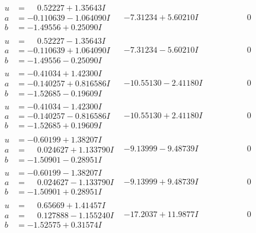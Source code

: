 \documentclass[1p]{elsarticle_modified}
\theoremstyle{definition}
\begin{document}
$$\begin{array}{c|c|c}
\begin{aligned}
u &= \phantom{-}0.52227 + 1.35643 I \\
a &= -0.110639 - 1.064090 I \\
b &= -1.49556 + 0.25090 I\end{aligned}
 & -7.31234 + 5.60210 I & \phantom{-0.000000 } 0 \\ \hline\begin{aligned}
u &= \phantom{-}0.52227 - 1.35643 I \\
a &= -0.110639 + 1.064090 I \\
b &= -1.49556 - 0.25090 I\end{aligned}
 & -7.31234 - 5.60210 I & \phantom{-0.000000 } 0 \\ \hline\begin{aligned}
u &= -0.41034 + 1.42300 I \\
a &= -0.140257 + 0.816586 I \\
b &= -1.52685 - 0.19609 I\end{aligned}
 & -10.55130 - 2.41180 I & \phantom{-0.000000 } 0 \\ \hline\begin{aligned}
u &= -0.41034 - 1.42300 I \\
a &= -0.140257 - 0.816586 I \\
b &= -1.52685 + 0.19609 I\end{aligned}
 & -10.55130 + 2.41180 I & \phantom{-0.000000 } 0 \\ \hline\begin{aligned}
u &= -0.60199 + 1.38207 I \\
a &= \phantom{-}0.024627 + 1.133790 I \\
b &= -1.50901 - 0.28951 I\end{aligned}
 & -9.13999 - 9.48739 I & \phantom{-0.000000 } 0 \\ \hline\begin{aligned}
u &= -0.60199 - 1.38207 I \\
a &= \phantom{-}0.024627 - 1.133790 I \\
b &= -1.50901 + 0.28951 I\end{aligned}
 & -9.13999 + 9.48739 I & \phantom{-0.000000 } 0 \\ \hline\begin{aligned}
u &= \phantom{-}0.65669 + 1.41457 I \\
a &= \phantom{-}0.127888 - 1.155240 I \\
b &= -1.52575 + 0.31574 I\end{aligned}
 & -17.2037 + 11.9877 I & \phantom{-0.000000 } 0 \\ \hline\begin{aligned}

\end{aligned}
\end{array}$$
\end{document}
